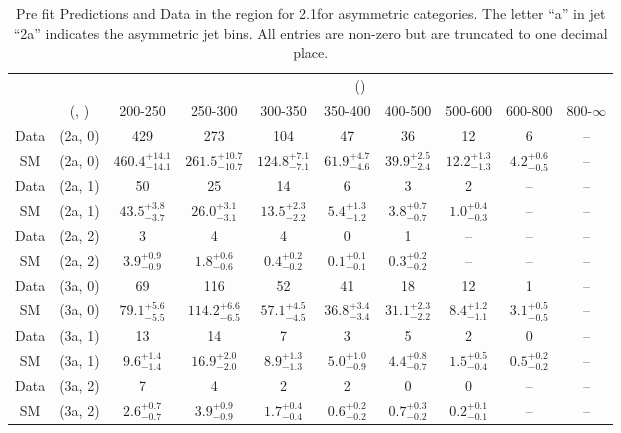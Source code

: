\begin{table}[h!]
\tiny
\centering
\caption{Pre fit Predictions and Data in the \mmj region for 2.1\ifb for asymmetric categories. The letter ``a'' in jet \eg ``2a''  indicates the asymmetric jet bins. All entries are non-zero but are truncated to one decimal place.\label{tab:predallqcdnaive_mumu_comb_asym}}
\begin{tabular}
{cccccccccc}
	\hline\hline
	&	& \multicolumn{8}{c}{\scalht (\gev)}\\ 
	&	 (\njet, \nb) & 200-250 & 250-300 & 300-350 & 350-400 & 400-500 & 500-600 & 600-800 & 800-$\infty$ \\ [0.8ex] 
\hline
	Data & (2a, 0) & 429 & 273 & 104 & 47 & 36 & 12 & 6 & -- \\[0.5ex] 
	SM & (2a, 0) & $460.4^{+ 14.1 }_{- 14.1 }$ & $261.5^{+ 10.7 }_{- 10.7 }$ & $124.8^{+ 7.1 }_{- 7.1 }$ & $61.9^{+ 4.7 }_{- 4.6 }$ & $39.9^{+ 2.5 }_{- 2.4 }$ & $12.2^{+ 1.3 }_{- 1.3 }$ & $4.2^{+ 0.6 }_{- 0.5 }$ & -- \\[0.5ex] 
	Data & (2a, 1) & 50 & 25 & 14 & 6 & 3 & 2 & -- & -- \\[0.5ex] 
	SM & (2a, 1) & $43.5^{+ 3.8 }_{- 3.7 }$ & $26.0^{+ 3.1 }_{- 3.1 }$ & $13.5^{+ 2.3 }_{- 2.2 }$ & $5.4^{+ 1.3 }_{- 1.2 }$ & $3.8^{+ 0.7 }_{- 0.7 }$ & $1.0^{+ 0.4 }_{- 0.3 }$ & -- & -- \\[0.5ex] 
	Data & (2a, 2) & 3 & 4 & 4 & 0 & 1 & -- & -- & -- \\[0.5ex] 
	SM & (2a, 2) & $3.9^{+ 0.9 }_{- 0.9 }$ & $1.8^{+ 0.6 }_{- 0.6 }$ & $0.4^{+ 0.2 }_{- 0.2 }$ & $0.1^{+ 0.1 }_{- 0.1 }$ & $0.3^{+ 0.2 }_{- 0.2 }$ & -- & -- & -- \\[0.5ex] 
	Data & (3a, 0) & 69 & 116 & 52 & 41 & 18 & 12 & 1 & -- \\[0.5ex] 
	SM & (3a, 0) & $79.1^{+ 5.6 }_{- 5.5 }$ & $114.2^{+ 6.6 }_{- 6.5 }$ & $57.1^{+ 4.5 }_{- 4.5 }$ & $36.8^{+ 3.4 }_{- 3.4 }$ & $31.1^{+ 2.3 }_{- 2.2 }$ & $8.4^{+ 1.2 }_{- 1.1 }$ & $3.1^{+ 0.5 }_{- 0.5 }$ & -- \\[0.5ex] 
	Data & (3a, 1) & 13 & 14 & 7 & 3 & 5 & 2 & 0 & -- \\[0.5ex] 
	SM & (3a, 1) & $9.6^{+ 1.4 }_{- 1.4 }$ & $16.9^{+ 2.0 }_{- 2.0 }$ & $8.9^{+ 1.3 }_{- 1.3 }$ & $5.0^{+ 1.0 }_{- 0.9 }$ & $4.4^{+ 0.8 }_{- 0.7 }$ & $1.5^{+ 0.5 }_{- 0.4 }$ & $0.5^{+ 0.2 }_{- 0.2 }$ & -- \\[0.5ex] 
	Data & (3a, 2) & 7 & 4 & 2 & 2 & 0 & 0 & -- & -- \\[0.5ex] 
	SM & (3a, 2) & $2.6^{+ 0.7 }_{- 0.7 }$ & $3.9^{+ 0.9 }_{- 0.9 }$ & $1.7^{+ 0.4 }_{- 0.4 }$ & $0.6^{+ 0.2 }_{- 0.2 }$ & $0.7^{+ 0.3 }_{- 0.2 }$ & $0.2^{+ 0.1 }_{- 0.1 }$ & -- & -- \\[0.5ex] 

\end{tabular}
\end{table}

